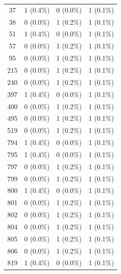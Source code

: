 \documentclass{article}
\begin{document}
\begin{table}[hbt!]
{\begin{tabular}{cccc}
37   & 1 (0.4\%)       & 0 (0.0\%)          & 1 (0.1\%)     \\
38   & 0 (0.0\%)       & 1 (0.2\%)          & 1 (0.1\%)     \\
51   & 1 (0.4\%)       & 0 (0.0\%)          & 1 (0.1\%)     \\
57   & 0 (0.0\%)       & 1 (0.2\%)          & 1 (0.1\%)     \\
95   & 0 (0.0\%)       & 1 (0.2\%)          & 1 (0.1\%)     \\
215  & 0 (0.0\%)       & 1 (0.2\%)          & 1 (0.1\%)     \\
240  & 0 (0.0\%)       & 1 (0.2\%)          & 1 (0.1\%)     \\
397  & 1 (0.4\%)       & 0 (0.0\%)          & 1 (0.1\%)     \\
400  & 0 (0.0\%)       & 1 (0.2\%)          & 1 (0.1\%)     \\
495  & 0 (0.0\%)       & 1 (0.2\%)          & 1 (0.1\%)     \\
519  & 0 (0.0\%)       & 1 (0.2\%)          & 1 (0.1\%)     \\
794  & 1 (0.4\%)       & 0 (0.0\%)          & 1 (0.1\%)     \\
795  & 1 (0.4\%)       & 0 (0.0\%)          & 1 (0.1\%)     \\
797  & 0 (0.0\%)       & 1 (0.2\%)          & 1 (0.1\%)     \\
799  & 0 (0.0\%)       & 1 (0.2\%)          & 1 (0.1\%)     \\
800  & 1 (0.4\%)       & 0 (0.0\%)          & 1 (0.1\%)     \\
801  & 0 (0.0\%)       & 1 (0.2\%)          & 1 (0.1\%)     \\
802  & 0 (0.0\%)       & 1 (0.2\%)          & 1 (0.1\%)     \\
804  & 0 (0.0\%)       & 1 (0.2\%)          & 1 (0.1\%)     \\
805  & 0 (0.0\%)       & 1 (0.2\%)          & 1 (0.1\%)     \\
806  & 0 (0.0\%)       & 1 (0.2\%)          & 1 (0.1\%)     \\
819  & 1 (0.4\%)       & 0 (0.0\%)          & 1 (0.1\%)    
\end{tabular}%
}
\end{table}
\end{document}
